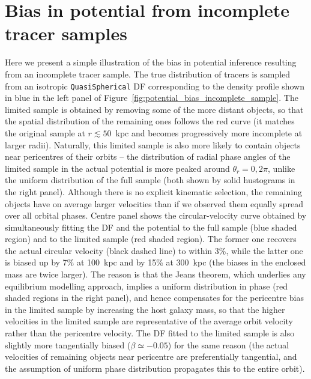 \documentclass[usenatbib,fleqn]{mnras}
\begin{document}
\vspace*{-5mm}
\section{Bias in potential from incomplete tracer samples}  \label{sec:potential_bias}

Here we present a simple illustration of the bias in potential inference resulting from an incomplete tracer sample. The true distribution of tracers is sampled from an isotropic \texttt{QuasiSpherical} DF corresponding to the density profile shown in blue in the left panel of Figure~\ref{fig:potential_bias_incomplete_sample}. The limited sample is obtained by removing some of the more distant objects, so that the spatial distribution of the remaining ones follows the red curve (it matches the original sample at $r\lesssim 50$~kpc and becomes progressively more incomplete at larger radii). Naturally, this limited sample is also more likely to contain objects near pericentres of their orbits -- the distribution of radial phase angles of the limited sample in the actual potential is more peaked around $\theta_r=0,2\pi$, unlike the uniform distribution of the full sample (both shown by solid hustograms in the right panel). Although there is no explicit kinematic selection, the remaining objects have on average larger velocities than if we observed them equally spread over all orbital phases.
Centre panel shows the circular-velocity curve obtained by simultaneously fitting the DF and the potential to the full sample (blue shaded region) and to the limited sample (red shaded region). The former one recovers the actual circular velocity (black dashed line) to within 3\%, while the latter one is biased up by 7\% at 100~kpc and by 15\% at 300~kpc (the biases in the enclosed mass are twice larger). The reason is that the Jeans theorem, which underlies any equilibrium modelling approach, implies a uniform distribution in phase (red shaded regions in the right panel), and hence compensates for the pericentre bias in the limited sample by increasing the host galaxy mass, so that the higher velocities in the limited sample are representative of the average orbit velocity rather than the pericentre velocity. The DF fitted to the limited sample is also slightly more tangentially biased ($\beta\simeq -0.05$) for the same reason (the actual velocities of remaining objects near pericentre are preferentially tangential, and the assumption of uniform phase distribution propagates this to the entire orbit).
\end{document}
